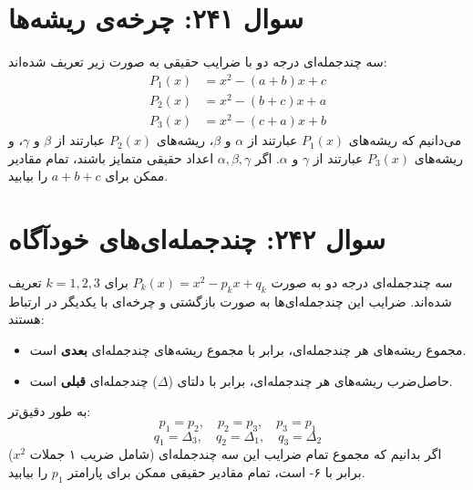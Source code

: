 \documentclass[12pt]{article}
\begin{document}
\vspace{1cm}
\hrulefill
\vspace{1cm}

\section*{سوال ۲۴۱: چرخه‌ی ریشه‌ها}
سه چندجمله‌ای درجه دو با ضرایب حقیقی به صورت زیر تعریف شده‌اند:
\begin{align*}
	P_1(x) &= x^2 - (a+b)x + c \\
	P_2(x) &= x^2 - (b+c)x + a \\
	P_3(x) &= x^2 - (c+a)x + b
\end{align*}
می‌دانیم که ریشه‌های \(P_1(x)\) عبارتند از \(\alpha\) و \(\beta\)، ریشه‌های \(P_2(x)\) عبارتند از \(\beta\) و \(\gamma\)، و ریشه‌های \(P_3(x)\) عبارتند از \(\gamma\) و \(\alpha\). اگر \(\alpha, \beta, \gamma\) اعداد حقیقی متمایز باشند، تمام مقادیر ممکن برای \(a+b+c\) را بیابید.

\vspace{1cm}
\hrulefill
\vspace{1cm}

\section*{سوال ۲۴۲: چندجمله‌ای‌های خودآگاه}
سه چندجمله‌ای درجه دو به صورت \( P_k(x) = x^2 - p_k x + q_k \) برای \(k=1, 2, 3\) تعریف شده‌اند. ضرایب این چندجمله‌ای‌ها به صورت بازگشتی و چرخه‌ای با یکدیگر در ارتباط هستند:
\begin{itemize}
	\item مجموع ریشه‌های هر چندجمله‌ای، برابر با مجموع ریشه‌های چندجمله‌ای \textbf{بعدی} است.
	\item حاصل‌ضرب ریشه‌های هر چندجمله‌ای، برابر با دلتای (\(\Delta\)) چندجمله‌ای \textbf{قبلی} است.
\end{itemize}
به طور دقیق‌تر:
\[ p_1 = p_2, \quad p_2 = p_3, \quad p_3 = p_1 \]
\[ q_1 = \Delta_3, \quad q_2 = \Delta_1, \quad q_3 = \Delta_2 \]
اگر بدانیم که مجموع تمام ضرایب این سه چندجمله‌ای (شامل ضریب ۱ جملات \(x^2\)) برابر با ۶- است، تمام مقادیر حقیقی ممکن برای پارامتر \(p_1\) را بیابید.
\end{document}
